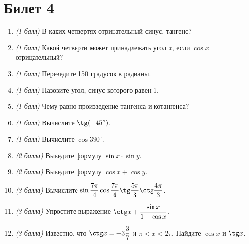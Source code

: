 \documentclass[12pt, a4paper]{article}
\begin{document}
\section*{Билет 4}
\begin{enumerate}
	\item \textit{(1 балл)} В каких четвертях отрицательный синус, тангенс?
	\item \textit{(1 балл)} Какой четверти может принадлежать угол $x$, если $\cos x$ отрицательный?
	\item \textit{(1 балл)} Переведите 150 градусов в радианы.
	\item \textit{(1 балл)} Назовите угол, синус которого равен 1.
	\item \textit{(1 балл)} Чему равно произведение тангенса и котангенса?
	\item \textit{(1 балл)} Вычислите $\tg (-45^{\circ})$.
	\item \textit{(1 балл)} Вычислите $\cos 390^{\circ}$.
	\item \textit{(2 балла)} Выведите формулу $\sin x \cdot \sin y$.
	\item \textit{(2 балла)} Выведите формулу $\cos x + \cos y$.
	\item \textit{(3 балла)} Вычислите $\sin \dfrac{7\pi}{4} \cos \dfrac{7\pi}{6} \tg \dfrac{5\pi}{3} \ctg \dfrac{4\pi}{3}$.
	\item \textit{(3 балла)} Упростите выражение $\ctg x + \dfrac{\sin x}{1+\cos x}$.
	\item \textit{(3 балла)} Известно, что $\ctg x = -3\dfrac{3}{7}$ и $\pi<x<2\pi$. Найдите $\cos x$ и $\tg x$.
\end{enumerate}

\newpage 
\end{document}
